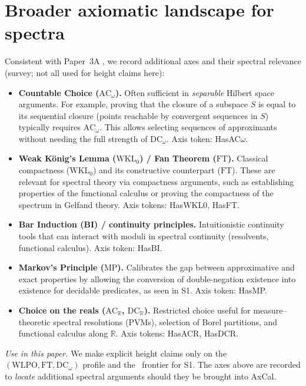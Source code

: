 \documentclass[11pt]{article}
\theoremstyle{plain}
\theoremstyle{definition}
\theoremstyle{remark}
\newcommand{\R}{\mathbb{R}}
\newcommand{\WLPO}{\mathrm{WLPO}}
\newcommand{\FT}{\mathrm{FT}}
\newcommand{\DCw}{\mathrm{DC}_\omega}
\newcommand{\ACw}{\mathrm{AC}_\omega}
\newcommand{\ACR}{\mathrm{AC}_{\mathbb{R}}}
\newcommand{\DCR}{\mathrm{DC}_{\mathbb{R}}}
\newcommand{\WKLz}{\mathrm{WKL}_0}
\newcommand{\MP}{\mathrm{MP}}
\begin{document}
\section{Broader axiomatic landscape for spectra}\label{sec:broad-axes}

Consistent with Paper~3A \cite{Paper3A}, we record additional axes and their spectral relevance (survey; not all used for height claims here):

\begin{itemize}
  \item \textbf{Countable Choice ($\ACw$).} Often sufficient in \emph{separable} Hilbert space arguments. For example, proving that the closure of a subspace $S$ is equal to its sequential closure (points reachable by convergent sequences in $S$) typically requires $\ACw$. This allows selecting sequences of approximants without needing the full strength of $\DCw$. Axis token: \textsf{HasAC$\omega$}.
  
  \item \textbf{Weak K\"onig's Lemma ($\WKLz$) / Fan Theorem ($\FT$).} Classical compactness ($\WKLz$) and its constructive counterpart ($\FT$). These are relevant for spectral theory via compactness arguments, such as establishing properties of the functional calculus or proving the compactness of the spectrum in Gelfand theory. Axis tokens: \textsf{HasWKL0}, \textsf{HasFT}.

  \item \textbf{Bar Induction (BI) / continuity principles.} Intuitionistic continuity tools that can interact with moduli in spectral continuity (resolvents, functional calculus). Axis token: \textsf{HasBI}.

  \item \textbf{Markov's Principle ($\MP$).} Calibrates the gap between approximative and exact properties by allowing the conversion of double-negation existence into existence for decidable predicates, as seen in S1. Axis token: \textsf{HasMP}.

  \item \textbf{Choice on the reals ($\ACR$, $\DCR$).} Restricted choice useful for measure--theoretic spectral resolutions (PVMs), selection of Borel partitions, and functional calculus along $\R$. Axis tokens: \textsf{HasACR}, \textsf{HasDCR}.
\end{itemize}

\noindent
\emph{Use in this paper.} We make explicit height claims only on the $(\WLPO,\FT,\DCw)$ profile and the \MP\ frontier for S1.
The axes above are recorded to \emph{locate} additional spectral arguments should they be brought into AxCal.
\end{document}
